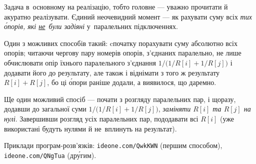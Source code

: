 \Tutorial	Задача в~основному на реалізацію, тобто головне --- уважно прочитати й акуратно реалізувати.
Єдиний неочевидний момент --- як рахувати суму всіх \emph{тих \'{о}порів, які \underline{не}~були задіяні} у~паралельних підключеннях.

Один з можливих способів такий: cпочатку порахувати суму абсолютно всіх опорів; читаючи чергову пару номерів опорів, з’єднаних паралельно, не лише обчислювати опір їхнього паралельного з’єднання $1/\bigl(1/R[i]+1/R[j]\bigr)$ і додавати його до результату, але також і віднімати з того ж результату $R[i]+R[j]$, бо ці \'{о}пори раніше додали, а виявилося, що даремно.

Ще один можливий спосіб --- почати з розгляду паралельних пар, і щоразу, додавши до загальної суми $1/\bigl(1/R[i]+1/R[j]\bigr)$, \emph{заміняти $R[i]$ та $R[j]$ на нулі}. Завершивши розгляд усіх паралельних пар, пододавати всі $R[i]$ (уже використані будуть нулями й не~вплинуть на результат).

Приклади програм-розв’язків: \verb"ideone.com/QwkKWN" (першим способом), \verb"ideone.com/QNgTua" (др\'{у}гим).
